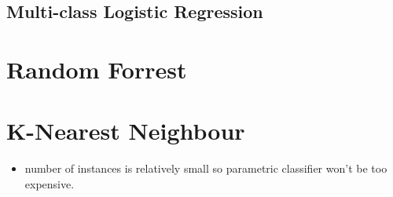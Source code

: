 \subsection{Multi-class Logistic Regression}

\section{Random Forrest}

\section{K-Nearest Neighbour}


\begin{itemize}
\item number of instances is relatively small so parametric classifier won't be too expensive. 
\end{itemize}
